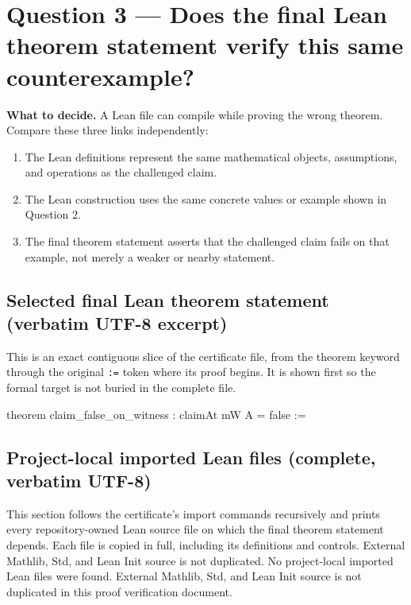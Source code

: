 \documentclass[11pt]{article}
\begin{document}
\section*{Question 3 --- Does the final Lean theorem statement verify this same counterexample?}
\textbf{What to decide.} A Lean file can compile while proving the wrong theorem. Compare these three links independently:
\begin{enumerate}
\item The Lean definitions represent the same mathematical objects, assumptions, and operations as the challenged claim.
\item The Lean construction uses the same concrete values or example shown in Question 2.
\item The final theorem statement asserts that the challenged claim fails on that example, not merely a weaker or nearby statement.
\end{enumerate}
\subsection*{Selected final Lean theorem statement (verbatim UTF-8 excerpt)}
This is an exact contiguous slice of the certificate file, from the theorem keyword through the original \texttt{:=} token where its proof begins. It is shown first so the formal target is not buried in the complete file.
\begin{Vlean}
theorem claim_false_on_witness : claimAt mW A = false :=
\end{Vlean}
\subsection*{Project-local imported Lean files (complete, verbatim UTF-8)}
This section follows the certificate's import commands recursively and prints every repository-owned Lean source file on which the final theorem statement depends. Each file is copied in full, including its definitions and controls. External Mathlib, Std, and Lean Init source is not duplicated.
No project-local imported Lean files were found. External Mathlib, Std, and Lean Init source is not duplicated in this proof verification document.
\end{document}
